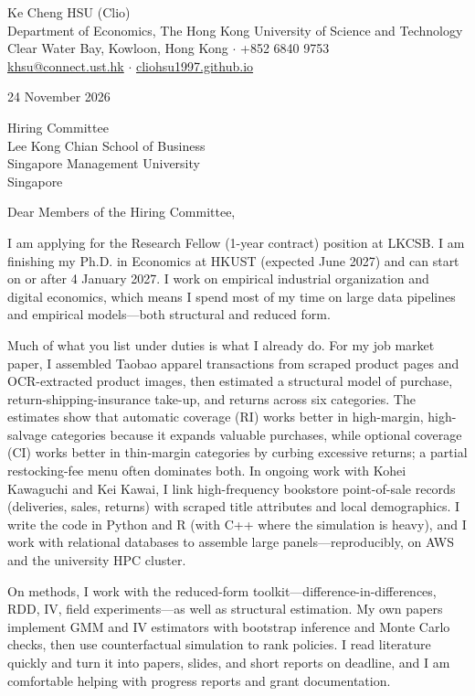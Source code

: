 \documentclass[11pt]{article}
\begin{document}
\begin{flushleft}
Ke Cheng HSU (Clio) \\
Department of Economics, The Hong Kong University of Science and Technology \\
Clear Water Bay, Kowloon, Hong Kong $\cdot$ +852 6840 9753 \\
\href{mailto:khsu@connect.ust.hk}{khsu@connect.ust.hk} $\cdot$ \href{https://cliohsu1997.github.io/}{cliohsu1997.github.io}
\end{flushleft}

24 November 2026

\vspace{0.08em}
Hiring Committee \\
Lee Kong Chian School of Business \\
Singapore Management University \\
Singapore

\vspace{0.08em}
Dear Members of the Hiring Committee,

I am applying for the Research Fellow (1-year contract) position at LKCSB. I am finishing my Ph.D. in Economics at HKUST (expected June 2027) and can start on or after 4 January 2027. I work on empirical industrial organization and digital economics, which means I spend most of my time on large data pipelines and empirical models---both structural and reduced form.

Much of what you list under duties is what I already do. For my job market paper, I assembled Taobao apparel transactions from scraped product pages and OCR-extracted product images, then estimated a structural model of purchase, return-shipping-insurance take-up, and returns across six categories. The estimates show that automatic coverage (RI) works better in high-margin, high-salvage categories because it expands valuable purchases, while optional coverage (CI) works better in thin-margin categories by curbing excessive returns; a partial restocking-fee menu often dominates both. In ongoing work with Kohei Kawaguchi and Kei Kawai, I link high-frequency bookstore point-of-sale records (deliveries, sales, returns) with scraped title attributes and local demographics. I write the code in Python and R (with C++ where the simulation is heavy), and I work with relational databases to assemble large panels---reproducibly, on AWS and the university HPC cluster.

On methods, I work with the reduced-form toolkit---difference-in-differences, RDD, IV, field experiments---as well as structural estimation. My own papers implement GMM and IV estimators with bootstrap inference and Monte Carlo checks, then use counterfactual simulation to rank policies. I read literature quickly and turn it into papers, slides, and short reports on deadline, and I am comfortable helping with progress reports and grant documentation.
\end{document}
